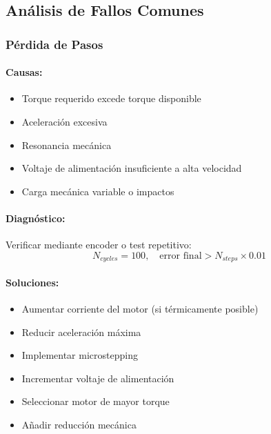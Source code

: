 \subsection{Análisis de Fallos Comunes}

\subsubsection{Pérdida de Pasos}

\paragraph{Causas:}

\begin{itemize}
    \item Torque requerido excede torque disponible
    \item Aceleración excesiva
    \item Resonancia mecánica
    \item Voltaje de alimentación insuficiente a alta velocidad
    \item Carga mecánica variable o impactos
\end{itemize}

\paragraph{Diagnóstico:}

Verificar mediante encoder o test repetitivo:
\begin{equation}
N_{cycles} = 100, \quad \text{error final} > N_{steps} \times 0.01
\end{equation}

\paragraph{Soluciones:}

\begin{itemize}
    \item Aumentar corriente del motor (si térmicamente posible)
    \item Reducir aceleración máxima
    \item Implementar microstepping
    \item Incrementar voltaje de alimentación
    \item Seleccionar motor de mayor torque
    \item Añadir reducción mecánica
\end{itemize}

